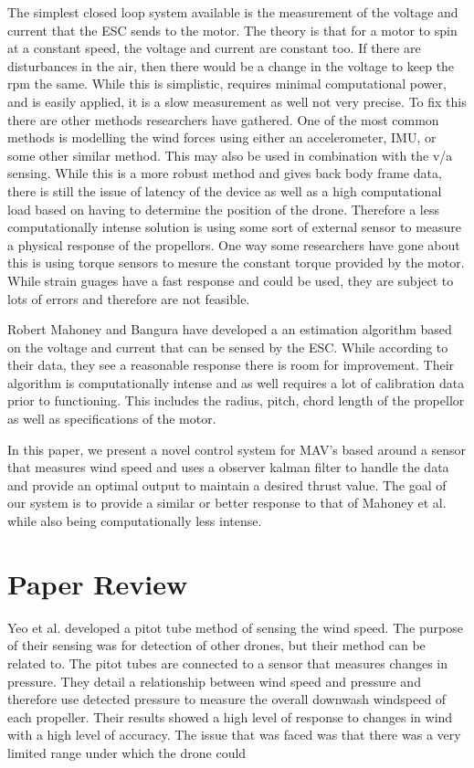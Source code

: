 \documentclass[twocolumn]{article}
\begin{document}
	The simplest closed loop system available is the measurement of the voltage and current that the ESC sends to the motor. The theory is that for a motor to spin at a constant speed, the voltage and current are constant too. If there are disturbances in the air, then there would be a change in the voltage to keep the rpm the same. While this is simplistic, requires minimal computational power, and is easily applied,  it is a slow measurement as well not very precise. To fix this there are other methods researchers have gathered. One of the most common methods is modelling the wind forces using either an accelerometer, IMU, or some other similar method. This may also be used in combination with the v/a sensing. While this is a more robust method and gives back body frame data, there is still the issue of latency of the device as well as a high computational load based on having to determine the position of the drone. Therefore a less computationally intense solution is using some sort of external sensor to measure a physical response of the propellors. One way some researchers have gone about this is using torque sensors to mesure the constant torque provided by the motor. While strain guages have a fast response and could be used, they are subject to lots of errors and therefore are not feasible. 
	
	Robert Mahoney and Bangura have developed a an estimation algorithm based on the voltage and current that can be sensed by the ESC. While according to their data, they see a reasonable response there is room for improvement. Their algorithm is computationally intense and as well requires a lot of calibration data prior to functioning. This includes the radius, pitch, chord length of the propellor as well as specifications of the motor. 
	
	In this paper, we present a novel control system for MAV's based around a sensor that measures wind speed and uses a observer kalman filter to handle the data and provide an optimal output to maintain a desired thrust value. The goal of our system is to provide a similar or better response to that of Mahoney et al. while also being computationally less intense. 
	\section{Paper Review}
	Yeo et al. developed a pitot tube method of sensing the wind speed. The purpose of their sensing was for detection of other drones, but their method can be related to. The pitot tubes are connected to a sensor that measures changes in pressure. They detail a relationship between wind speed and pressure and therefore use detected pressure to measure the overall downwash windspeed of each propeller. Their results showed a high level of response to changes in wind with a high level of accuracy. The issue that was faced was that there was a very limited range under which the drone could
	
\end{document}
